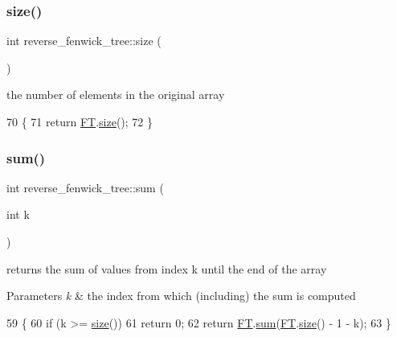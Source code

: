 \subsubsection{\texorpdfstring{size()}{size()}}
{\footnotesize\ttfamily int reverse\+\_\+fenwick\+\_\+tree\+::size (\begin{DoxyParamCaption}{ }\end{DoxyParamCaption})\hspace{0.3cm}{\ttfamily [inline]}}



the number of elements in the original array 


\begin{DoxyCode}
70             \{
71     \textcolor{keywordflow}{return} \hyperlink{classreverse__fenwick__tree_acde105967b3a3befc31e743807f7fd86}{FT}.\hyperlink{classfenwick__tree_abedd21a2ddbbb830195c8eba1330112f}{size}();
72   \}
\end{DoxyCode}
\mbox{\label{classreverse__fenwick__tree_a672731fd6395b4853430073a099a80e6}} 
\subsubsection{\texorpdfstring{sum()}{sum()}}
{\footnotesize\ttfamily int reverse\+\_\+fenwick\+\_\+tree\+::sum (\begin{DoxyParamCaption}\item[{int}]{k }\end{DoxyParamCaption})}

returns the sum of values from index k until the end of the array 
\begin{DoxyParams}{Parameters}
{\em k} & the index from which (including) the sum is computed \\
\hline
\end{DoxyParams}

\begin{DoxyCode}
59 \{
60   \textcolor{keywordflow}{if} (k >= \hyperlink{classreverse__fenwick__tree_ae15a8ac2ee6049baadcd110a98ae96e8}{size}())
61     \textcolor{keywordflow}{return} 0;
62   \textcolor{keywordflow}{return} \hyperlink{classreverse__fenwick__tree_acde105967b3a3befc31e743807f7fd86}{FT}.\hyperlink{classfenwick__tree_adad26fa851d811b4d1e0328a5c6eae03}{sum}(\hyperlink{classreverse__fenwick__tree_acde105967b3a3befc31e743807f7fd86}{FT}.\hyperlink{classfenwick__tree_abedd21a2ddbbb830195c8eba1330112f}{size}() - 1 - k); 
63 \}
\end{DoxyCode}


